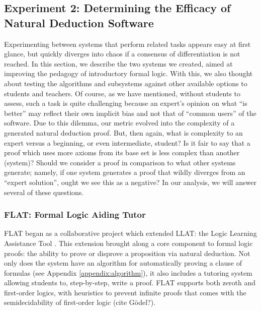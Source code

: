 \documentclass[ms]{uncgdissertationexp2}
\theoremstyle{plain}
\theoremstyle{definition}
\theoremstyle{remark}
\begin{document}
\subsection{Experiment 2: Determining the Efficacy of Natural Deduction Software}
Experimenting between systems that perform related tasks appears easy at first glance, but quickly diverges into chaos if a consensus of differentiation is not reached. In this section, we describe the two systems we created, aimed at improving the pedagogy of introductory formal logic. With this, we also thought about testing the algorithms and subsystems against other available options to students and teachers. Of course, as we have mentioned, without students to assess, such a task is quite challenging because an expert's opinion on what ``is better'' may reflect their own implicit bias and not that of ``common users'' of the software. Due to this dilemma, our metric evolved into the complexity of a generated natural deduction proof. But, then again, what is complexity to an expert versus a beginning, or even intermediate, student? Is it fair to say that a proof which uses more axioms from its base set is less complex than another (system)? Should we consider a proof in comparison to what other systems generate; namely, if one system generates a proof that wildly diverges from an ``expert solution'', ought we see this as a negative? In our analysis, we will answer several of these questions.  

\subsubsection{FLAT: Formal Logic Aiding Tutor} \label{section:flat}
FLAT began as a collaborative project which extended LLAT: the Logic Learning Assistance Tool \cite{llat}. This extension brought along a core component to formal logic proofs: the ability to prove or disprove a proposition via natural deduction. Not only does the system have an algorithm for automatically proving a clause of formulas (see Appendix \ref{appendix:algorithm}), it also includes a tutoring system allowing students to, step-by-step, write a proof. FLAT supports both zeroth and first-order logics, with heuristics to prevent infinite proofs that comes with the semidecidability of first-order logic (cite G\"odel?).
\end{document}
